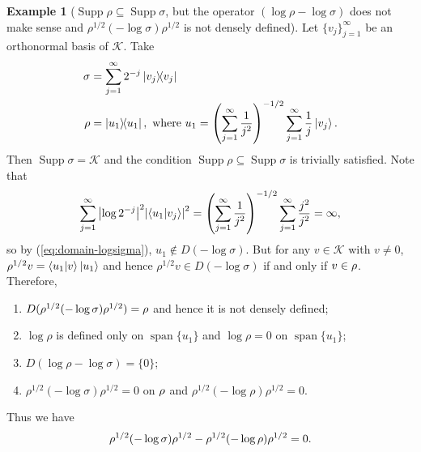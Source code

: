 \documentclass[12pt,a4paper,oneside]{article}
\numberwithin{equation}{section}
\theoremstyle{definition}  %
\newtheorem{eg}[defn]{Example}
\theoremstyle{plain}  %
\theoremstyle{remark} %
\newcommand{\CK}{\mathcal{K}}
\let\tr\relax
\DeclareMathOperator{\tr}{Tr}
\let\ker\relax
\DeclareMathOperator{\ker}{Ker}
\DeclareMathOperator{\supp}{Supp}
\DeclareMathOperator{\spn}{span}
\begin{document}
 \begin{eg}[$\supp \rho \subseteq \supp \sigma$, but the operator $(\log\rho -\log\sigma)$ does not make sense and $\rho^{1/2}(-\log\sigma)\rho^{1/2}$  is not densely defined]\label{eg:counter-example} \label{eg:support-condition-not-enough}
Let $\{v_j\}_{j=1}^{\infty}$ be an orthonormal basis of $\CK $. Take
\begin{align*}
    \sigma&= \sum_{j=1}^{\infty} 2^{-j}\ketbra{v_j}\\
    \rho &= \ketbra{u_1}, \textnormal{ where }  u_1 =\left(\sum_{j=1}^{\infty}\frac{1}{j^2}\right)^{-1/2}\sum_{j=1}^{\infty}\frac{1}{j}\ket{v_j}.
\end{align*}  Then $\supp \sigma = \CK $ and
 the condition $\supp \rho \subseteq \supp \sigma$ is trivially satisfied. Note that
 \[\sum_{j=1}^{\infty}\abs{\log 2^{-j}}^2\abs{\braket{u_1}{v_j}}^2 =\left(\sum_{j=1}^{\infty}\frac{1}{j^2}\right)^{-1/2} \sum_{j=1}^{\infty}\frac{j^2}{j^2}=\infty, \] so by (\ref{eq:domain-logsigma}),
 $u_1\notin D(-\log \sigma)$. But for any $ v\in \CK $ with $v\neq 0$,  $\rho^{1/2}v = \braket{u_1}{v}\ket{u_1}$ and hence $\rho^{1/2}v\in D(-\log \sigma)$ if and only if $v\in \ker \rho$. Therefore, \begin{enumerate}
     \item $ D(\rho^{1/2}(-\log\sigma) \rho^{1/2}) = \ker \rho$ and hence it is not densely defined;
     \item $\log \rho$ is defined only on $\spn \{u_1\}$ and $\log \rho =0$ on $\spn \{u_1\}$;
     \item $D(\log \rho -\log \sigma) =\{0\}$;
     \item $\rho^{1/2}(-\log\sigma) \rho^{1/2}=0$ on $\ker \rho$ and $\rho^{1/2}(-\log\rho)\rho^{1/2} =0 $.
 \end{enumerate}   
  Thus we have   \begin{align}
   \tr \rho^{1/2}(-\log\sigma)\rho^{1/2}-\tr\rho^{1/2}(-\log\rho)\rho^{1/2} = 0.  
 \end{align} 
 \end{eg}
\end{document}
